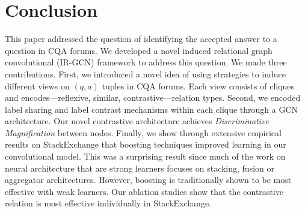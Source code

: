 \section{Conclusion}
\label{sec:conclude}
This paper addressed the question of identifying the accepted answer to a question in CQA forums. We developed a novel induced relational graph convolutional (IR-GCN) framework to address this question. We made three contributions. First, we introduced a novel idea of using strategies to induce different views on $(q,a)$ tuples in CQA forums. Each view consists of cliques and encodes---reflexive, similar, contrastive---relation types. Second, we encoded label sharing and label contrast mechanisms within each clique through a GCN architecture.  Our novel contrastive architecture achieves \emph{Discriminative Magnification} between nodes. Finally, we show through extensive empirical results on StackExchange that boosting techniques improved learning in our convolutional model.
This was a surprising result since much of the work on neural architecture that are strong learners focuses on stacking, fusion or aggregator architectures. However, boosting is traditionally shown to be most effective with weak learners.
Our ablation studies show that the contrastive relation is most effective individually in StackExchange.
